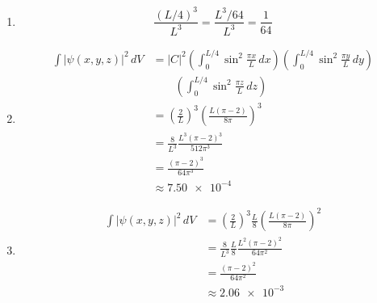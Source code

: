 \documentclass{article}
\begin{document}
\begin{enumerate}
  \item \[\frac{(L / 4)^3}{L^3} = \frac{L^3 / 64}{L^3} = \frac{1}{64}\]

  \item

        \begin{align*}
          \int |\psi(x, y, z)|^2 \,dV & = |C|^2 \left( \int_0^{L / 4} \sin^2 \frac{\pi x}{L} \,dx \right) \left( \int_0^{L / 4} \sin^2 \frac{\pi y}{L} \,dy \right) \\
                                      & \qquad \left( \int_0^{L / 4} \sin^2 \frac{\pi z}{L} \,dz \right)                                                            \\
                                      & = \left( \frac{2}{L} \right)^3 \left( \frac{L (\pi - 2)}{8 \pi} \right)^3                                                   \\
                                      & = \frac{8}{L^3} \frac{L^3 (\pi - 2)^3}{512 \pi^3}                                                                           \\
                                      & = \frac{(\pi - 2)^3}{64 \pi^3}                                                                                              \\
                                      & \approx \num{7.50e-4}
        \end{align*}

  \item

        \begin{align*}
          \int |\psi(x, y, z)|^2 \,dV & = \left( \frac{2}{L} \right)^3 \frac{L}{8} \left( \frac{L (\pi - 2)}{8 \pi} \right)^2 \\
                                      & = \frac{8}{L^3} \frac{L}{8} \frac{L^2 (\pi - 2)^2}{64 \pi^2}                          \\
                                      & = \frac{(\pi - 2)^2}{64 \pi^2}                                                        \\
                                      & \approx \num{2.06e-3}
        \end{align*}
\end{enumerate}

\setcounter{subsubsection}{42}
\subsubsection{}
\end{document}
